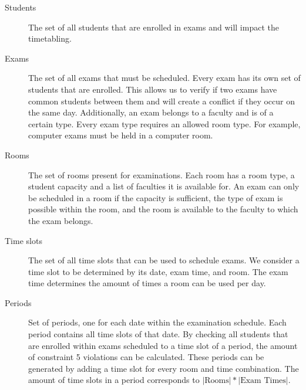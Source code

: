 \begin{description}
   \item [Students] The set of all students that are enrolled in exams and will impact the timetabling.
   \item[Exams] The set of all exams that must be scheduled. Every exam has its own set of students that are enrolled. This allows us to verify if two exams have common students between them and will create a conflict if they occur on the same day. Additionally, an exam belongs to a faculty and is of a certain type. Every exam type requires an allowed room type. For example, computer exams must be held in a computer room.
   \item[Rooms] The set of rooms present for examinations. Each room has a room type, a student capacity and a list of faculties it is available for. An exam can only be scheduled in a room if the capacity is sufficient, the type of exam is possible within the room, and the room is available to the faculty to which the exam belongs.
    \item[Time slots] The set of all time slots that can be used to schedule exams. We consider a time slot to be determined by its date, exam time, and room. The exam time determines the amount of times a room can be used per day.
    \item[Periods] Set of periods, one for each date within the examination schedule. Each period contains all time slots of that date. By checking all students that are enrolled within exams scheduled to a time slot of a period, the amount of constraint 5 violations can be calculated. These periods can be generated by adding a time slot for every room and time combination. The amount of time slots in a period corresponds to $|\text{Rooms}| * |\text{Exam Times}|$.
\end{description}
